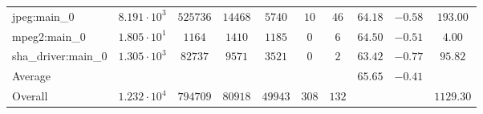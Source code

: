 \begin{tabular}{|l|c|c|c|c|c|c|c|c|c|}
jpeg:main\_0            & $ 8.191 \cdot 10^{3} $ & $ 525736 $ & $ 14468 $ & $ 5740  $ & $ 10  $ & $ 46  $ & $ 64.18       $ & $ -0.58   $ & $ 193.00  $ \\
mpeg2:main\_0           & $ 1.805 \cdot 10^{1} $ & $ 1164   $ & $ 1410  $ & $ 1185  $ & $ 0   $ & $ 6   $ & $ 64.50       $ & $ -0.51   $ & $ 4.00    $ \\
sha\_driver:main\_0     & $ 1.305 \cdot 10^{3} $ & $ 82737  $ & $ 9571  $ & $ 3521  $ & $ 0   $ & $ 2   $ & $ 63.42       $ & $ -0.77   $ & $ 95.82   $ \\
\hline
Average                 & $                    $ & $        $ & $       $ & $       $ & $     $ & $     $ & $ 65.65       $ & $ -0.41   $ & $         $ \\
\hline
Overall                 & $ 1.232 \cdot 10^{4} $ & $ 794709 $ & $ 80918 $ & $ 49943 $ & $ 308 $ & $ 132 $ & $             $ & $         $ & $ 1129.30 $ \\
\hline
\end{tabular}
